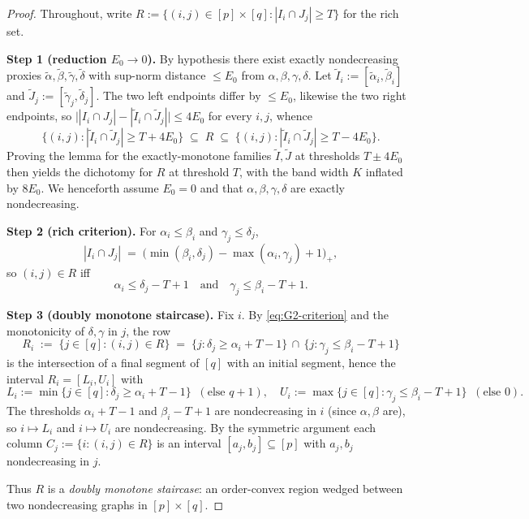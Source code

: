 \begin{proof}
Throughout, write $R := \{(i,j)\in[p]\times[q] : |I_i\cap J_j|\ge T\}$ for the rich set.

\medskip\noindent\textbf{Step 1 (reduction $E_0\to 0$).}
By hypothesis there exist exactly nondecreasing proxies
$\tilde\alpha,\tilde\beta,\tilde\gamma,\tilde\delta$ with sup-norm distance $\le E_0$ from
$\alpha,\beta,\gamma,\delta$. Let $\tilde I_i := [\tilde\alpha_i,\tilde\beta_i]$ and
$\tilde J_j := [\tilde\gamma_j,\tilde\delta_j]$. The two left endpoints differ by $\le E_0$,
likewise the two right endpoints, so
$\big||I_i\cap J_j|-|\tilde I_i\cap\tilde J_j|\big|\le 4E_0$ for every $i,j$, whence
\[
\{(i,j) : |\tilde I_i\cap\tilde J_j|\ge T+4E_0\}\;\subseteq\;R\;\subseteq\;\{(i,j) : |\tilde I_i\cap\tilde J_j|\ge T-4E_0\}.
\]
Proving the lemma for the exactly-monotone families $\tilde I,\tilde J$ at thresholds
$T\pm 4E_0$ then yields the dichotomy for $R$ at threshold $T$, with the band width
$K$ inflated by $8E_0$. We henceforth assume $E_0=0$ and that $\alpha,\beta,\gamma,\delta$
are exactly nondecreasing.

\medskip\noindent\textbf{Step 2 (rich criterion).}
For $\alpha_i\le\beta_i$ and $\gamma_j\le\delta_j$,
\[
|I_i\cap J_j| \;=\; \big(\min(\beta_i,\delta_j)-\max(\alpha_i,\gamma_j)+1\big)_+,
\]
so $(i,j)\in R$ iff
\begin{equation}\label{eq:G2-criterion}
\alpha_i\le\delta_j-T+1\quad\text{and}\quad\gamma_j\le\beta_i-T+1.
\end{equation}

\medskip\noindent\textbf{Step 3 (doubly monotone staircase).}
Fix $i$. By \eqref{eq:G2-criterion} and the monotonicity of $\delta,\gamma$ in $j$,
the row
\[
R_i \;:=\; \{j\in[q]:(i,j)\in R\}
\;=\; \{j:\delta_j\ge\alpha_i+T-1\}\,\cap\,\{j:\gamma_j\le\beta_i-T+1\}
\]
is the intersection of a final segment of $[q]$ with an initial segment, hence the
interval $R_i = [L_i,U_i]$ with
\[
L_i := \min\{j\in[q]:\delta_j\ge\alpha_i+T-1\}\;\;(\text{else }q{+}1),
\quad
U_i := \max\{j\in[q]:\gamma_j\le\beta_i-T+1\}\;\;(\text{else }0).
\]
The thresholds $\alpha_i+T-1$ and $\beta_i-T+1$ are nondecreasing in $i$ (since
$\alpha,\beta$ are), so $i\mapsto L_i$ and $i\mapsto U_i$ are nondecreasing.
By the symmetric argument each column $C_j := \{i:(i,j)\in R\}$ is an interval
$[a_j,b_j]\subseteq[p]$ with $a_j,b_j$ nondecreasing in $j$.

Thus $R$ is a \emph{doubly monotone staircase}: an order-convex region wedged between
two nondecreasing graphs in $[p]\times[q]$.


\end{proof}
